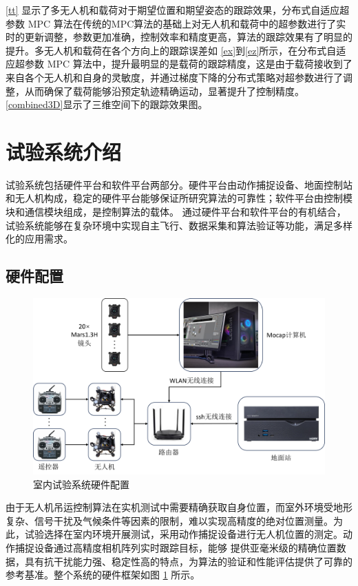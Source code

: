 \documentclass[lang=chs, degree=master, blindreview=true, winfonts=true]{yanputhesis}
\begin{document}
\autoref{tt} 显示了多无人机和载荷对于期望位置和期望姿态的跟踪效果，分布式自适应超参数 MPC 算法在传统的MPC算法的基础上对无人机和载荷中的超参数进行了实时的更新调整，参数更加准确，控制效率和精度更高，算法的跟踪效果有了明显的提升。多无人机和载荷在各个方向上的跟踪误差如 \autoref{ex}到\autoref{ez}所示，在分布式自适应超参数 MPC 算法中，提升最明显的是载荷的跟踪精度，这是由于载荷接收到了来自各个无人机和自身的灵敏度，并通过梯度下降的分布式策略对超参数进行了调整，从而确保了载荷能够沿预定轨迹精确运动，显著提升了控制精度。\autoref{combined3D}显示了三维空间下的跟踪效果图。


\section{试验系统介绍}

试验系统包括硬件平台和软件平台两部分。硬件平台由动作捕捉设备、地面控制站和无人机构成，稳定的硬件平台能够保证所研究算法的可靠性；软件平台由控制模块和通信模块组成，是控制算法的载体。
通过硬件平台和软件平台的有机结合，试验系统能够在复杂环境中实现自主飞行、数据采集和算法验证等功能，满足多样化的应用需求。

\subsection{硬件配置}
\begin{figure}[hbt!]
	\centering
	\includegraphics[width=36pc]{picture/5_4.png} 
	\caption{室内试验系统硬件配置} 
	\label{framework}
\end{figure}
由于无人机吊运控制算法在实机测试中需要精确获取自身位置，而室外环境受地形复杂、信号干扰及气候条件等因素的限制，难以实现高精度的绝对位置测量。为此，试验选择在室内环境开展测试，采用动作捕捉设备进行无人机位置的测定。动作捕捉设备通过高精度相机阵列实时跟踪目标，能够
提供亚毫米级的精确位置数据，具有抗干扰能力强、稳定性高的特点，为算法的验证和性能评估提供了可靠的参考基准。整个系统的硬件框架如图 \ref{framework} 所示。
\end{document}
